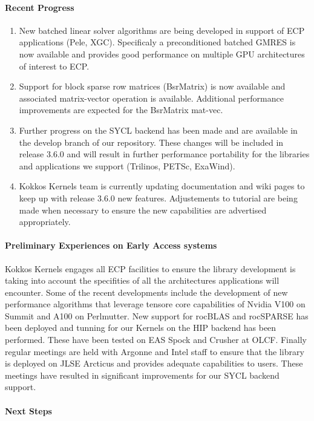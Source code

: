 \paragraph{Recent Progress}
\begin{enumerate}
\item New batched linear solver algorithms are being developed in support of ECP applications (Pele, XGC).
Specificaly a preconditioned batched GMRES is now available and provides good performance on multiple GPU
architectures of interest to ECP.
\item Support for block sparse row matrices (BsrMatrix) is now available and associated matrix-vector
operation is available. Additional performance improvements are expected for the BsrMatrix mat-vec.
\item Further progress on the SYCL backend has been made and are available in the develop branch of
our repository. These changes will be included in release 3.6.0 and will result in further performance
portability for the libraries and applications we support (Trilinos, PETSc, ExaWind).
\item Kokkos Kernels team is currently updating documentation and wiki pages to keep up with release 3.6.0
new features. Adjustements to tutorial are being made when necessary to ensure the new capabilities are
advertised appropriately.
\end{enumerate}

\paragraph{Preliminary Experiences on Early Access systems}
Kokkos Kernels engages all ECP facilities to ensure the library development is taking into account
the specifities of all the architectures applications will encounter. Some of the recent developments
include the development of new performance algorithms that leverage tensore core capabilities of
Nvidia V100 on Summit and A100 on Perlmutter. New support for rocBLAS and rocSPARSE has been deployed
and tunning for our Kernels on the HIP backend has been performed. These have been tested on EAS Spock
and Crusher at OLCF. Finally regular meetings are held with Argonne and Intel staff to ensure that the
library is deployed on JLSE Arcticus and provides adequate capabilities to users. These meetings have
resulted in significant improvements for our SYCL backend support.

\paragraph{Next Steps}

